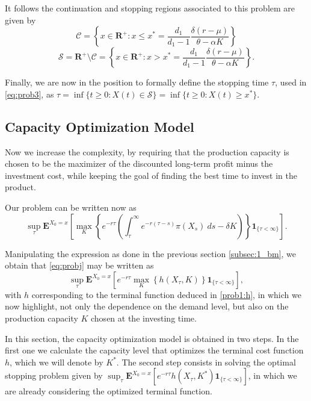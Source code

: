 It follows the continuation and stopping regions associated to this problem are given by
$$\mathcal{C}=\left\{ x \in \textbf{R}^+: x \leq x^* = \frac{d_1}{d_1-1} \frac{ \delta (r-\mu)}{\theta-\alpha K} \right\}$$
$$\mathcal{S}=\textbf{R}^+ \setminus \mathcal{C}= \left\{ x \in \textbf{R}^+: x > x^* = \frac{d_1}{d_1-1} \frac{ \delta (r-\mu)}{\theta-\alpha K} \right\}.$$

Finally, we are now in the position to formally define the stopping time $\tau$, used in \eqref{eq:prob3}, as $\tau=\inf\{t\geq0: X(t) \in \mathcal{S} \}=\inf\{t\geq 0: X(t) \geq x^* \}$.




\subsection{Capacity Optimization Model}
\label{subsec:1_com}

Now we increase the complexity, by requiring that the production capacity is chosen to be the maximizer of the discounted long-term profit minus the investment cost, while keeping the goal of finding the best time to invest in the product.

Our problem can be written now as
\begin{equation}
\sup_\tau \textbf{E}^{X_0=x} \left[ \max_K \left\{ e^{-r\tau }  \left( \int_\tau^\infty e^{-r(\tau-s)} \pi(X_s)\ ds -\delta K \right) \right\} \textbf{1}_{\{\tau<\infty\}} \right].
\label{eq:probj}
\end{equation}

Manipulating the expression as done in the previous section \ref{subsec:1_bm}, we obtain that \eqref{eq:probj} may be written as
\begin{equation}
\sup_\tau \textbf{E}^{X_0=x} \left[ e^{-r\tau } \max_K \left\{ h(X_\tau,K) \right\} \textbf{1}_{\{\tau<\infty\}} \right],
\label{eq:q1}
\end{equation}
with $h$ corresponding to the terminal function deduced in \eqref{prob1:h}, in which we now highlight, not only the dependence on the demand level, but also on the production capacity $K$ chosen at the investing time.

In this section, the capacity optimization model is obtained in two steps. In the first one we calculate the capacity level that optimizes the terminal cost function $h$, which we will denote by $K^*$. The second step consists in solving the optimal stopping problem given by $\sup_\tau \textbf{E}^{X_0=x}\left[e^{-r\tau}h(X_\tau,K^*) \textbf{1}_{\{\tau<\infty\}} \right]$, in which we are already considering the optimized terminal function.

